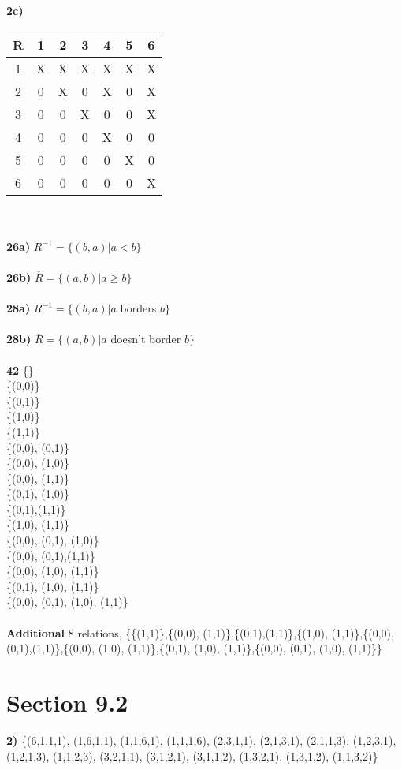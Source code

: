 \documentclass{article}
\begin{document}
\textbf{2c)}
\begin{tabular}{ c | c c c c c c }
  R & 1 & 2 & 3 & 4 & 5 & 6 \\ \hline
  1 & X & X & X & X & X & X \\ 
  2 & 0 & X & 0 & X & 0 & X \\
  3 & 0 & 0 & X & 0 & 0 & X \\ 
  4 & 0 & 0 & 0 & X & 0 & 0 \\ 
  5 & 0 & 0 & 0 & 0 & X & 0 \\ 
  6 & 0 & 0 & 0 & 0 & 0 & X \\ 
\end{tabular}
\\\\
\textbf{26a)} $R^{-1}=\{(b,a)|a<b\}$
\\\\
\textbf{26b)} $\overline{R}=\{(a,b)|a\ge b\}$
\\\\
\textbf{28a)} $R^{-1}=\{(b,a)|a$ borders $b\}$
\\\\
\textbf{28b)} $\overline{R}=\{(a,b)|a$ doesn't border $b\}$
\\\\
\textbf{42} \{\}
\\\{(0,0)\}
\\\{(0,1)\}
\\\{(1,0)\}
\\\{(1,1)\}
\\\{(0,0), (0,1)\}
\\\{(0,0), (1,0)\}
\\\{(0,0), (1,1)\}
\\\{(0,1), (1,0)\}
\\\{(0,1),(1,1)\}
\\\{(1,0), (1,1)\}
\\\{(0,0), (0,1), (1,0)\}
\\\{(0,0), (0,1),(1,1)\}
\\\{(0,0), (1,0), (1,1)\}
\\\{(0,1), (1,0), (1,1)\}
\\\{(0,0), (0,1), (1,0), (1,1)\}
\\\\
\textbf{Additional} 8 relations, \{\{(1,1)\},\{(0,0), (1,1)\},\{(0,1),(1,1)\},\{(1,0), (1,1)\},\{(0,0), (0,1),(1,1)\},\{(0,0), (1,0), (1,1)\},\{(0,1), (1,0), (1,1)\},\{(0,0), (0,1), (1,0), (1,1)\}\}

\section*{Section 9.2}
\textbf{2)} \{(6,1,1,1),
(1,6,1,1),
(1,1,6,1),
(1,1,1,6),
(2,3,1,1),
(2,1,3,1),
(2,1,1,3),
(1,2,3,1),
(1,2,1,3),
(1,1,2,3),
(3,2,1,1),
(3,1,2,1),
(3,1,1,2),
(1,3,2,1),
(1,3,1,2),
(1,1,3,2)\}
\end{document}
